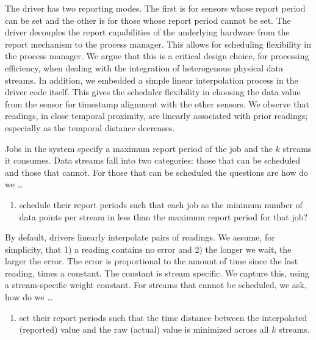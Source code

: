 \documentclass[10pt,print,letterpaper]{sigplan-proc-varsize}
\begin{document}
The driver has two reporting modes.  The first is for sensors whose report period can be set
and the other is for those whose report period cannot be set.  The driver decouples the report
capabilities of the underlying hardware from the report mechanism to the process manager.  This 
allows for scheduling flexibility in the process
manager.  We argue that this is a critical design choice, for processing efficiency, when dealing 
with the integration of heterogenous physical data streams.  In addition, we embedded a simple linear
interpolation process in the driver code itself.  This gives the scheduler flexibility in choosing the
data value from the sensor for timestamp alignment with the other sensors.  We observe that readings,
in close temporal proximity, are linearly associated with prior readings; especially as
the temporal distance decreases.

Jobs in the system specify a maximum report period of the job and the $k$ streams it consumes.  
Data streams fall into two categories: those that can be scheduled and those that cannot.  For
those that can be scheduled the questions are how do we \dots

\begin{enumerate}
\item schedule their report periods such that each job as the minimum number of data points per stream in 
less than the maximum report period for that job?
\end{enumerate}

By default, drivers linearly interpolate pairs of readings.  We assume, for simplicity, that
1) a reading contains no error and 2) the longer we wait, the larger the error.  The 
error is proportional to the amount of time since the last reading, times a constant.
The constant is stream specific.  We capture this, using a stream-specific weight constant.
For streams that cannot be scheduled, we ask, how do we \dots

\begin{enumerate}
\item set their report periods such that the time distance between the interpolated (reported) value
and the raw (actual) value is minimized across all $k$ streams.
\end{enumerate}
\end{document}
